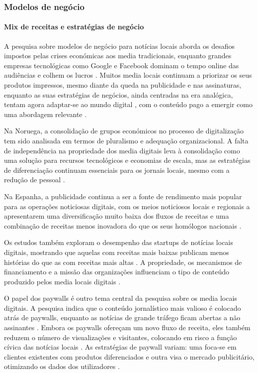 \documentclass[portuguese]{textolivre}
\begin{document}
\subsubsection{Modelos de negócio}

\paragraph{Mix de receitas e estratégias de negócio}

A pesquisa sobre modelos de negócio para notícias locais aborda os desafios impostos pelas crises económicas aos media tradicionais, enquanto grandes empresas tecnológicas como Google e Facebook dominam o tempo online das audiências e colhem os lucros \cite{hindman2018}. Muitos media locais continuam a priorizar os seus produtos impressos, mesmo diante da queda na publicidade e nas assinaturas, enquanto as suas estratégias de negócios, ainda centradas na era analógica, tentam agora adaptar-se ao mundo digital \cite{jenkins2020a,cestino2023}, com o conteúdo pago a emergir como uma abordagem relevante \cite{jenkins2023}.

Na Noruega, a consolidação de grupos económicos no processo de digitalização tem sido analisada em termos de pluralismo e adequação organizacional. A falta de independência na propriedade dos media digitais leva à consolidação como uma solução para recursos tecnológicos e economias de escala, mas as estratégias de diferenciação continuam essenciais para os jornais locais, mesmo com a redução de pessoal \cite{sjovaag2014,sjovaag2021}.

Na Espanha, a publicidade continua a ser a fonte de rendimento mais popular para as operações noticiosas digitais, com os meios noticiosos locais e regionais a apresentarem uma diversificação muito baixa dos fluxos de receitas e uma combinação de receitas menos inovadora do que os seus homólogos nacionais \cite{varamiguel2021}.

Os estudos também exploram o desempenho das startups de notícias locais digitais, mostrando que aquelas com receitas mais baixas publicam menos histórias do que as com receitas mais altas \cite{chadha2019}. A propriedade, os mecanismos de financiamento e a missão das organizações influenciam o tipo de conteúdo produzido pelos media locais digitais \cite{harlow2021}.

O papel dos paywalls é outro tema central da pesquisa sobre os media locais digitais. A pesquisa indica que o conteúdo jornalístico mais valioso é colocado atrás de paywalls, enquanto as notícias de grande tráfego ficam abertas a não assinantes \cite{sjovaag2016,kvalheim2013}. Embora os paywalls ofereçam um novo fluxo de receita, eles também reduzem o número de visualizações e visitantes, colocando em risco a função cívica das notícias locais  \cite{olsen-etal2020}. As estratégias de paywall variam: uma foca-se em clientes existentes com produtos diferenciados e outra visa o mercado publicitário, otimizando os dados dos utilizadores \cite{olsen2018}.
\end{document}
